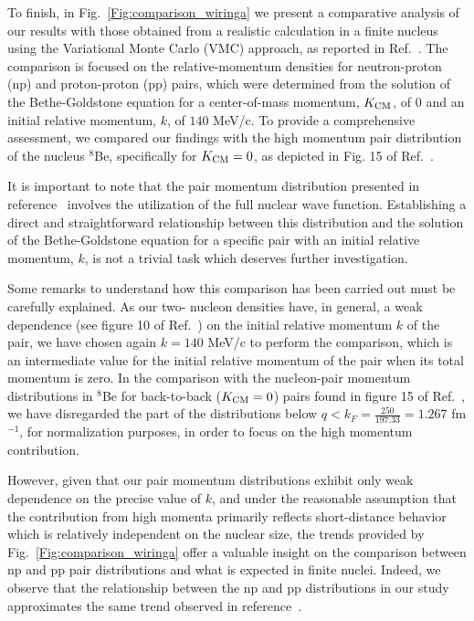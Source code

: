 \documentclass[aps,twocolumn,showpacs,preprintnumbers,amsmath,amssymb,nofootinbib,superscriptaddress,showkeys,noeprint]{revtex4-1}
\begin{document}
To finish, in Fig.~\ref{Fig:comparison_wiringa} we present a
comparative analysis of our results with those obtained from a
realistic calculation in a finite nucleus using the Variational Monte
Carlo (VMC) approach, as reported in Ref.~\cite{Wiringa:2013ala}.  The
comparison is focused on the relative-momentum densities for
neutron-proton (np) and proton-proton (pp) pairs, which were
determined from the solution of the Bethe-Goldstone equation for a
center-of-mass momentum, $K_{\rm CM}$, of $0$ and an initial relative
momentum, $k$, of $140$ MeV/c.  To provide a comprehensive assessment,
we compared our findings with the high momentum pair distribution of
the nucleus ${}^8$Be, specifically for $K_{\rm CM}=0$, as depicted in
Fig. 15 of Ref.~\cite{Wiringa:2013ala}.


It is important to note that the pair momentum distribution presented
in reference~\cite{Wiringa:2013ala} involves the utilization of the
full nuclear wave function. Establishing a direct and straightforward
relationship between this distribution and the solution of the
Bethe-Goldstone equation for a specific pair with an initial relative
momentum, $k$, is not a trivial task which deserves further
investigation.

Some remarks to understand how this comparison has been carried out
must be carefully explained. As our two- nucleon densities have, in
general, a weak dependence (see figure 10 of
Ref.~\cite{RuizSimo:2017tcb}) on the initial relative momentum $k$ of
the pair, we have chosen again $k=140$ MeV/c to perform the
comparison, which is an intermediate value for the initial relative
momentum of the pair when its total momentum is zero. In the
comparison with the nucleon-pair momentum distributions in ${}^{8}$Be
for back-to-back ($K_{\rm CM}=0$) pairs found in figure 15 of
Ref.~\cite{Wiringa:2013ala}, we have disregarded the part of the
distributions below $q<k_F=\frac{250}{197.33}=1.267$ fm${}^{-1}$, for
normalization purposes, in order to focus on the high momentum
contribution.


However, given that our pair momentum distributions exhibit only weak
dependence on the precise value of $k$, and under the reasonable
assumption that the contribution from high momenta primarily reflects
short-distance behavior which is relatively independent on the nuclear
size, the trends provided by Fig.~\ref{Fig:comparison_wiringa} offer a
valuable insight on the comparison between np and pp pair
distributions and what is expected in finite nuclei.  Indeed, we
observe that the relationship between the np and pp distributions in
our study approximates the same trend observed in
reference~\cite{Wiringa:2013ala}.
\end{document}
